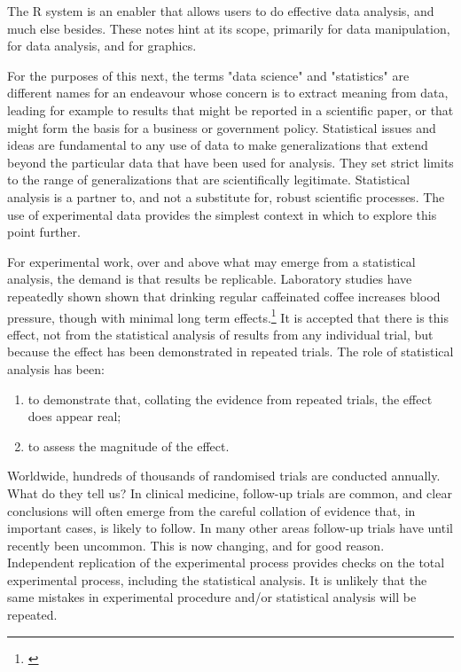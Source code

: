 The R system is an enabler that allows users to do effective
data analysis, and much else besides.  These notes hint at
its scope, primarily for data manipulation, for data analysis,
and for graphics. 

For the purposes of this next, the terms "data science" and
"statistics" are different names for an endeavour whose concern
is to extract meaning from data, leading for example to results
that might be reported in a scientific paper, or that might form
the basis for a business or government policy.  Statistical
issues and ideas are fundamental to any use of data to make
generalizations that extend beyond the particular data that
have been used for analysis.  They set strict limits to the 
range of generalizations that are scientifically legitimate.
Statistical analysis is a partner to, and not a substitute
for, robust scientific processes.  The use of experimental data
provides the simplest context in which to explore this point
further.

For experimental work, over and above what may emerge from a
statistical analysis, the demand is that results be replicable.
Laboratory studies have repeatedly shown shown that drinking
regular caffeinated coffee increases blood pressure, though
with minimal long term effects.\footnote{\citet{green_kirby_suls_1996}
}  It is accepted that there is
this effect, not from the statistical analysis of results from
any individual trial, but because the effect has been demonstrated
in repeated trials.  The role of statistical analysis has been:
\begin{enumerate}
\tightlist
\item to demonstrate that, collating the evidence from repeated
trials, the effect does appear real; 
\item to assess the magnitude of the effect.
\end{enumerate}

Worldwide, hundreds of thousands of randomised trials are
conducted annually.  What do they tell us?  In clinical medicine,
follow-up trials are common, and clear conclusions will often
emerge from the careful collation of evidence that, in important
cases, is likely to follow.  In many other areas follow-up trials
have until recently been uncommon. This is now changing, and for
good reason.  Independent replication of the experimental process
provides checks on the total experimental process, including the
statistical analysis.  It is unlikely that the same mistakes in
experimental procedure and/or statistical analysis will be repeated.

